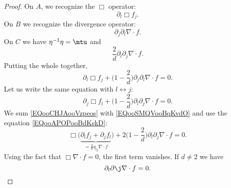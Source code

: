 \begin{proof}
	On \( A\), we recognize the \( \Box\) operator:
	\begin{equation}
		\partial_l\Box f_j.
	\end{equation}
	On \( B\) we recognize the divergence operator:
	\begin{equation}
		\partial_j\partial_l\nabla\cdot  f.
	\end{equation}
	On \( C\) we have \( \eta^{-1}\eta=\mtu\) and
	\begin{equation}
		\frac{ 2 }{ d }\partial_l\partial_j\nabla\cdot f.
	\end{equation}
	Putting the whole together,
	\begin{equation}    \label{EQooCHJAooVzpeos}
		\partial_l\Box f_j+\big( 1-\frac{ 2 }{ d } \big)\partial_j\partial_l\nabla\cdot f=0.
	\end{equation}
	Let us write the same equation with \( l\leftrightarrow j\):
	\begin{equation}    \label{EQooSMQVooBqKvdO}
		\partial_j\Box f_l+\big( 1-\frac{ 2 }{ d } \big)\partial_l\partial_j\nabla\cdot f=0.
	\end{equation}
	We sum \eqref{EQooCHJAooVzpeos} with \eqref{EQooSMQVooBqKvdO}  and use the equation \eqref{EQooAPOPooBdKskD}:
	\begin{equation}
		\Box\big( \underbrace{\partial_l f_j+\partial_j f_l}_{=\frac{ 2 }{ d }\eta_{lj}\nabla\cdot f} \big)+2\big( 1-\frac{ 2 }{ d } \big)\partial_l\partial_j\nabla\cdot  f=0.
	\end{equation}
	Using the fact that \( \Box\nabla\cdot f=0\), the first term vanishes. If \( d\neq 2\) we have
	\begin{equation}
		\partial_l\partial\j\nabla\cdot  f=0.
	\end{equation}


\end{proof}
